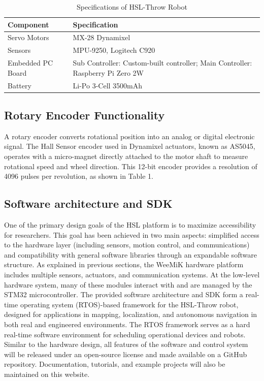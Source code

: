 \documentclass[conference]{IEEEtran}
\begin{document}
\begin{table}[htbp]
\centering
\caption{Specifications of HSL-Throw Robot}
\begin{tabular}{|p{3cm}|p{5cm}|}
\hline
\textbf{Component}         & \textbf{Specification} \\ \hline
Servo Motors               & MX-28 Dynamixel      \\ \hline
Sensors                    & MPU-9250, Logitech C920 \\ \hline
Embedded PC Board          & Sub Controller: Custom-built controller; Main Controller: Raspberry Pi Zero 2W \\ \hline
Battery                    & Li-Po 3-Cell 3500mAh    \\ \hline
\end{tabular}
\label{tab:hsl_locomotion}
\end{table}

\subsection{Rotary Encoder Functionality}
A rotary encoder converts rotational position into an analog or digital electronic signal. The Hall Sensor encoder used in Dynamixel actuators, known as AS5045, operates with a micro-magnet directly attached to the motor shaft to measure rotational speed and wheel direction. This 12-bit encoder provides a resolution of 4096 pulses per revolution, as shown in Table 1.

\subsection{Software architecture and SDK}
One of the primary design goals of the HSL platform is to maximize accessibility for researchers. This goal has been achieved in two main aspects: simplified access to the hardware layer (including sensors, motion control, and communications) and compatibility with general software libraries through an expandable software structure. As explained in previous sections, the WeeMiK hardware platform includes multiple sensors, actuators, and communication systems. At the low-level hardware system, many of these modules interact with and are managed by the STM32 microcontroller. The provided software architecture and SDK form a real-time operating system (RTOS)-based framework for the HSL-Throw robot, designed for applications in mapping, localization, and autonomous navigation in both real and engineered environments. The RTOS framework serves as a hard real-time software environment for scheduling operational devices and robots. Similar to the hardware design, all features of the software and control system will be released under an open-source license and made available on a GitHub repository. Documentation, tutorials, and example projects will also be maintained on this website.
\end{document}
